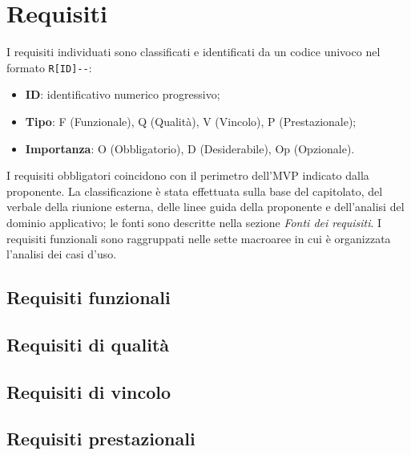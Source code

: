 \section{Requisiti}
I requisiti individuati sono classificati e identificati da un codice univoco nel formato \texttt{R[ID]-\allowbreak[Tipo]-\allowbreak[Importanza]}:
	\begin{itemize}
		\item \textbf{ID}: identificativo numerico progressivo;
		\item \textbf{Tipo}: F (Funzionale), Q (Qualità), V (Vincolo), P (Prestazionale);
		\item \textbf{Importanza}: O (Obbligatorio), D (Desiderabile), Op (Opzionale).
	\end{itemize}
I requisiti obbligatori coincidono con il perimetro dell'MVP indicato dalla proponente. La classificazione è stata effettuata sulla base del capitolato, del verbale della riunione esterna, delle linee guida della proponente e dell'analisi del dominio applicativo; le fonti sono descritte nella sezione \textit{Fonti dei requisiti}. I requisiti funzionali sono raggruppati nelle sette macroaree in cui è organizzata l'analisi dei casi d'uso.

\subsection{Requisiti funzionali}


\subsection{Requisiti di qualità}


\subsection{Requisiti di vincolo}


\subsection{Requisiti prestazionali}

